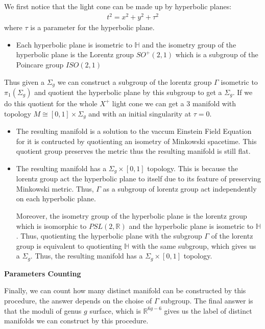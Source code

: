 We first notice that the light cone can be made up by hyperbolic planes:
\begin{align}
  t^2 = x^2 + y^2 + \tau^2
\end{align}
where $ \tau $ is a parameter for the hyperbolic plane.
\begin{itemize}
  \item Each hyperbolic plane is isometric to $ \mathbb{H} $ and the
    isometry group of the hyperbolic plane is the Lorentz group $
    SO^+(2,1) $ which is a subgroup of the Poincare group $ ISO(2,1) $
\end{itemize}
Thus given a
$ \Sigma_g $ we can construct a subgroup of the lorentz group $ \Gamma $
isometric to $ \pi_1(\Sigma_g) $ and quotient the hyperbolic plane by
this subgroup to get a $ \Sigma_g $. If we do this quotient for the
whole $ X^+ $ light cone we can get a 3 manifold with topology $ M
\cong [0,1] \times \Sigma_g $ and with an initial singularity at $ \tau
= 0 $.
\begin{itemize}
  \item The resulting manifold is a solution to the vaccum Einstein
    Field Equation for it is contructed by quotienting an isometry of
    Minkowski spacetime. This quotient group preserves the metric
    thus the resulting manifold is still flat.

  \item The resulting manifold has a $ \Sigma_g \times [0,1] $
    topology. This is because the lorentz group act the hyperbolic
    plane to itself due to its feature of preserving Minkowski
    metric. Thus, $ \Gamma $ as a subgroup of lorentz group act
    independently on each hyperbolic
    plane.

    Moreover, the isometry group of the hyperbolic plane is
    the lorentz group which is isomorphic to $ PSL(2,\mathbb{R}) $
    and the hyperbolic plane is isometric to $
    \mathbb{H} $. Thus, quotienting the hyperbolic plane with the
    subgroup $ \Gamma $ of the lorentz group is equivalent to
    quotienting $ \mathbb{H} $ with the same subgroup, which gives us
    a $ \Sigma_g $. Thus, the resulting manifold has a $ \Sigma_g
    \times [0,1] $ topology.
\end{itemize}

\textbf{Parameters Counting}

Finally, we can count how many distinct manifold can be constructed
by this procedure, the answer depends on the choise of $ \Gamma $
subgroup. The final answer is that the moduli of genus $ g $ surface,
which is $ \mathbb{R}^{6g-6} $ gives us the label of distinct
manifolds we can construct by this procedure.

